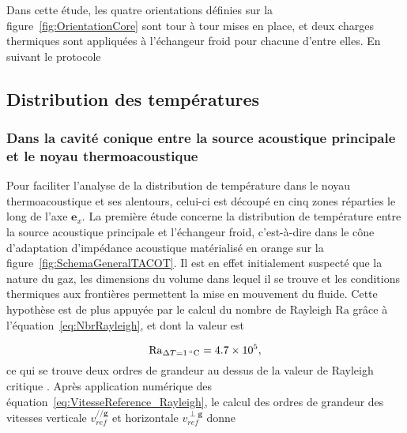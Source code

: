 Dans cette étude, les quatre orientations définies sur la figure~\ref{fig:OrientationCore} sont tour à tour mises en place, et deux charges thermiques sont appliquées à l'échangeur froid pour chacune d'entre elles. En suivant le protocole 

\subsection{Distribution des températures}
\subsubsection{Dans la cavité conique entre la source acoustique principale et le noyau thermoacoustique}

Pour faciliter l'analyse de la distribution de température dans le noyau thermoacoustique et ses alentours, celui-ci est découpé en cinq zones réparties le long de l'axe $\mathbf{e}_x$.
La première étude concerne la distribution de température entre la source acoustique principale et l'échangeur froid, c'est-à-dire dans le cône d'adaptation d'impédance acoustique matérialisé en orange sur la figure~\ref{fig:SchemaGeneralTACOT}. Il est en effet initialement suspecté que la nature du gaz, les dimensions du volume dans lequel il se trouve et les conditions thermiques aux frontières permettent la mise en mouvement du fluide. Cette hypothèse est de plus appuyée par le calcul du nombre de Rayleigh $\mathrm{Ra}$ grâce à l'équation~\eqref{eq:NbrRayleigh}, et dont la valeur est

\begin{equation}
	\Rayleigh_{\Delta T=\qty{1}{\degreeCelsius}}=\num{4.7e5},
	\label{eq:NbrRayleigh_Exple1K}
\end{equation}  
ce qui se trouve deux ordres de grandeur au dessus de la valeur de Rayleigh critique \cite{getling_rayleigh-benard_1998}. Après application numérique des équation~\eqref{eq:VitesseReference_Rayleigh}, le calcul des ordres de grandeur des vitesses verticale $v_{ref}^{// \mathbf g}$ et horizontale $v_{ref}^{\perp \mathbf g}$ donne

